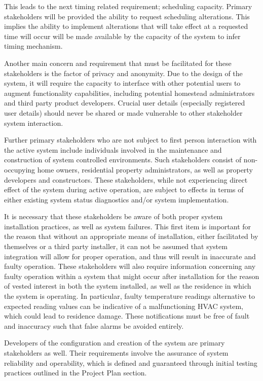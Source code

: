 \documentclass{article}
\begin{document}
This leads to the next timing related requirement; scheduling capacity. Primary stakeholders will be provided the ability to request scheduling alterations. This implies the ability to implement alterations that will take effect at a requested time will occur will be made available by the capacity of the system to infer timing mechanism.

Another main concern and requirement that must be facilitated for these stakeholders is the factor of privacy and anonymity. Due to the design of the system, it will require the capacity to interface with other potential users to augment functionality capabilities, including potential homestead administrators and third party product developers. Crucial user details (especially registered user details) should never be shared or made vulnerable to other stakeholder system interaction.

Further primary stakeholders who are not subject to first person interaction with the active system include individuals involved in the maintenance and construction of system controlled environments. Such stakeholders consist of non-occupying home owners, residential property administrators, as well as property developers and constructors. These stakeholders, while not experiencing direct effect of the system during active operation, are subject to effects in terms of either existing system status diagnostics and/or system implementation. 

It is necessary that these stakeholders be aware of both proper system installation practices, as well as system failures. This first item is important for the reason that without an appropriate means of installation, either facilitated by themselves or a third party installer, it can not be assumed that system integration will allow for proper operation, and thus will result in inaccurate and faulty operation. These stakeholders will also require information concerning any faulty operation within a system that might occur after installation for the reason of vested interest in both the system installed, as well as the residence in which the system is operating. In particular, faulty temperature readings alternative to expected reading values can be indicative of a malfunctioning \gls{HVAC} system, which could lead to residence damage. These notifications must be free of fault and inaccuracy such that false alarms be avoided entirely.

Developers of the configuration and creation of the system are primary stakeholders as well. Their requirements involve the assurance of system reliability and operability, which is defined and guaranteed through initial testing practices outlined in the Project Plan section. 
\end{document}
